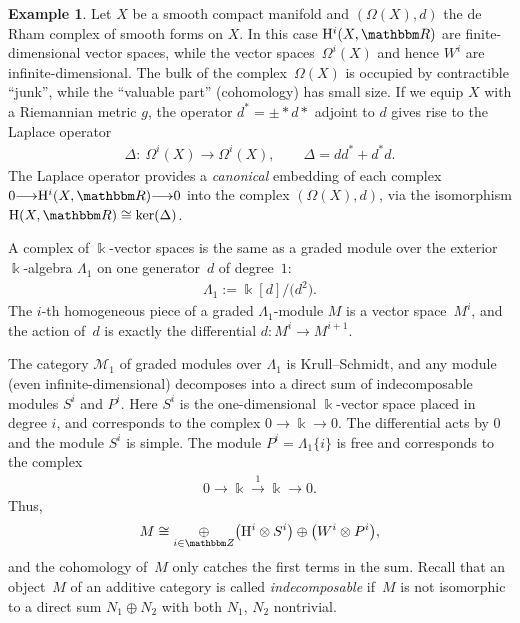 \documentclass[pdftex]{sigma}
\theoremstyle{definition}
\newtheorem{Example}[thm]{Example}
\numberwithin{equation}{section}
\def\R{{\mathbbm R}}
\def\Z{{\mathbbm Z}}
\def\lra{{\longrightarrow}}
\def\mc{\mathcal}
\newcommand{\oplusop}[1]{{\mathop{\oplus}\limits_{#1}}}
\newcommand{\mH}{\mathrm{H}} %
\begin{document}
\begin{Example}
Let $X$ be a smooth compact manifold and $(\Omega(X), d)$ the
de Rham complex of smooth forms on $X$. In this case $\mH^i(X,\R)$
are finite-dimensional vector spaces, while the vector spaces~$\Omega^i(X)$
and hence $W^i$ are infinite-dimensional. The bulk of the complex~$\Omega(X)$
is occupied by contractible ``junk'', while the ``valuable part'' (cohomology) has
small size.
If we equip $X$ with a Riemannian metric $g$, the operator $d^{\ast}=\pm \ast d\ast$
adjoint to $d$ gives rise to the Laplace operator
\begin{gather*}\Delta\colon \ \Omega^i(X) \lra \Omega^i(X), \qquad
\Delta= dd^{\ast} + d^{\ast} d.\end{gather*}
The Laplace operator provides a \emph{canonical} embedding of each complex
$ 0 \lra \mH^i(X,\R) \lra 0 $ into the complex $(\Omega(X), d)$, via the isomorphism
 $\mH(X,\R) \cong \operatorname{ker}(\Delta)$.
\end{Example}

A complex of $\Bbbk$-vector spaces is the same as a graded module over the exterior
$\Bbbk$-algebra $\Lambda_1$ on one generator~$d$ of degree~$1$:
\begin{gather*} \Lambda_1 := \Bbbk [d]/\big(d^2\big). \end{gather*}
The $i$-th homogeneous piece of a graded $\Lambda_1$-module $M$ is
a vector space~$M^i$, and the action of~$d$ is exactly the differential
$d\colon M^i \lra M^{i+1}$.

The category $\mc{M}_1$ of graded modules over $\Lambda_1$ is Krull--Schmidt, and
any module (even infinite-dimensional) decomposes into a direct sum of
indecomposable modules $S^i$ and $P^i$. Here $S^i$ is the one-dimensional
$\Bbbk$-vector space placed in degree $i$, and corresponds to the complex
$0 \lra \Bbbk \lra 0$. The differential acts by $0$ and the module $S^i$ is simple.
The module $P^i = \Lambda_1\{ i\}$ is free and corresponds to the complex
\begin{gather*} 0 \lra \Bbbk \stackrel{1}{\lra} \Bbbk \lra 0. \end{gather*}
Thus,
\begin{gather*} M \cong \oplusop{i\in \Z}\big(\mH^i \otimes S^i\big) \oplus \big(W^i\otimes P^i\big),\end{gather*}
and the cohomology of~$M$ only catches the first terms in the sum. Recall that an object~$M$ of an additive category is called \emph{indecomposable} if~$M$ is not isomorphic to a direct sum $N_1\oplus N_2$ with both $N_1$, $N_2$ nontrivial.
\end{document}
